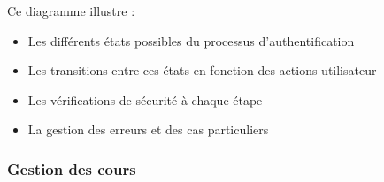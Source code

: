 Ce diagramme illustre :

\begin{itemize}
  \item Les différents états possibles du processus d'authentification
  
  \item Les transitions entre ces états en fonction des actions utilisateur
  
  \item Les vérifications de sécurité à chaque étape
  
  \item La gestion des erreurs et des cas particuliers
\end{itemize}

\subsubsection{Gestion des cours}

